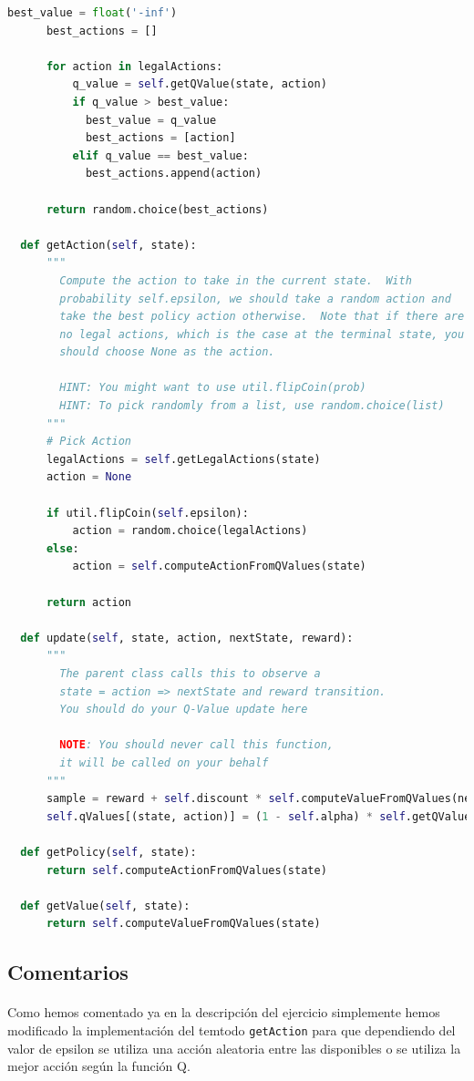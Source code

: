 \documentclass{report}
\begin{document}
\begin{lstlisting}[language=Python, caption=Epsilon Greedy]
      best_value = float('-inf')
      best_actions = []
      
      for action in legalActions:
          q_value = self.getQValue(state, action)
          if q_value > best_value:
            best_value = q_value
            best_actions = [action]
          elif q_value == best_value:
            best_actions.append(action)
      
      return random.choice(best_actions)

  def getAction(self, state):
      """
        Compute the action to take in the current state.  With
        probability self.epsilon, we should take a random action and
        take the best policy action otherwise.  Note that if there are
        no legal actions, which is the case at the terminal state, you
        should choose None as the action.

        HINT: You might want to use util.flipCoin(prob)
        HINT: To pick randomly from a list, use random.choice(list)
      """
      # Pick Action
      legalActions = self.getLegalActions(state)
      action = None
      
      if util.flipCoin(self.epsilon):
          action = random.choice(legalActions)
      else:
          action = self.computeActionFromQValues(state)

      return action

  def update(self, state, action, nextState, reward):
      """
        The parent class calls this to observe a
        state = action => nextState and reward transition.
        You should do your Q-Value update here

        NOTE: You should never call this function,
        it will be called on your behalf
      """
      sample = reward + self.discount * self.computeValueFromQValues(nextState)
      self.qValues[(state, action)] = (1 - self.alpha) * self.getQValue(state, action) + self.alpha * sample

  def getPolicy(self, state):
      return self.computeActionFromQValues(state)

  def getValue(self, state):
      return self.computeValueFromQValues(state)

\end{lstlisting}
      \subsection*{Comentarios}
        \paragraph*{}{
          Como hemos comentado ya en la descripción del ejercicio simplemente hemos modificado la implementación del temtodo \texttt{getAction} para que dependiendo del valor de epsilon se utiliza una acción aleatoria entre las disponibles o se utiliza la mejor acción según la función Q.
        }
\end{document}
